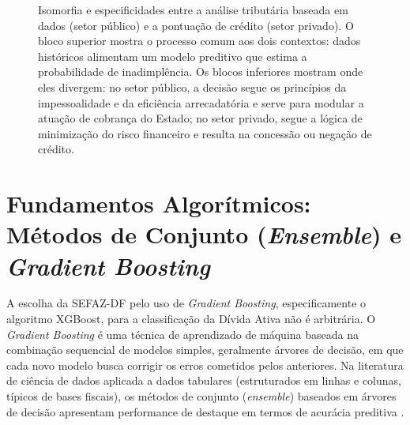 \begin{figure}[H]
    \caption[Isomorfia entre análise tributária baseada em dados e pontuação de crédito]{Isomorfia e especificidades entre a análise tributária baseada em dados (setor público) e a pontuação de crédito (setor privado). O bloco superior mostra o processo comum aos dois contextos: dados históricos alimentam um modelo preditivo que estima a probabilidade de inadimplência. Os blocos inferiores mostram onde eles divergem: no setor público, a decisão segue os princípios da impessoalidade e da eficiência arrecadatória e serve para modular a atuação de cobrança do Estado; no setor privado, segue a lógica de minimização do risco financeiro e resulta na concessão ou negação de crédito.}
    \label{fig:flow_tax_analytics}

\end{figure}

\section{Fundamentos Algorítmicos: Métodos de Conjunto (\textit{Ensemble}) e \textit{Gradient Boosting}}
\label{sec:gbdt}

A escolha da SEFAZ-DF pelo uso de \textit{Gradient Boosting}, especificamente o algoritmo XGBoost, para a classificação da Dívida Ativa não é arbitrária. O \textit{Gradient Boosting} é uma técnica de aprendizado de máquina baseada na combinação sequencial de modelos simples, geralmente árvores de decisão, em que cada novo modelo busca corrigir os erros cometidos pelos anteriores. Na literatura de ciência de dados aplicada a dados tabulares (estruturados em linhas e colunas, típicos de bases fiscais), os métodos de conjunto (\textit{ensemble}) baseados em árvores de decisão apresentam performance de destaque em termos de acurácia preditiva \cite{schwartzEnhancingMLModels2025,friedman2001greedy}.

